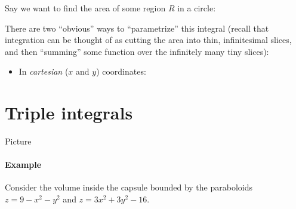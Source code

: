\documentclass{multi}
\begin{document}
Say we want to find the area of some region \(R\) in a circle: %
\begin{center}
       
\end{center}
There are two ``obvious'' ways to ``parametrize'' this integral (recall that integration can be thought of as cutting the area into thin, infinitesimal slices, and then ``summing'' some function over the infinitely many tiny slices):
\begin{itemize}
\item In \emph{cartesian} (\(x\) and \(y\)) coordinates:
    \begin{center}
    \end{center}
\end{itemize}

\section*{Triple integrals}

Picture 



\paragraph{Example}

Consider the volume inside the capsule bounded by the paraboloids \(z = 9 - x^2 - y^2\) and \(z = 3x^2 + 3y^2 - 16\). 

\end{document}
